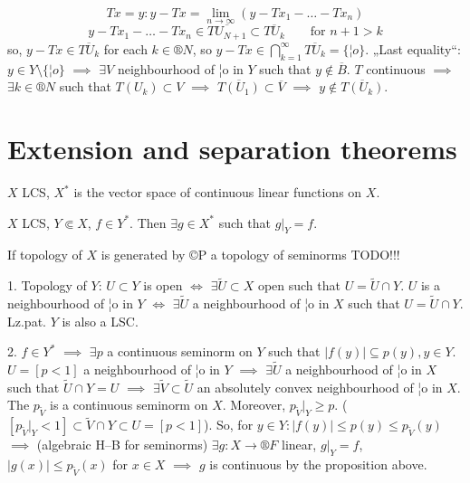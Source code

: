 \documentclass[12pt]{article}					%
\begin{document}
\begin{veta}
\begin{dukazin}
		$$ Tx = y: y - Tx = \lim_{n \rightarrow ∞} (y - Tx_1 - … - Tx_n) $$
		$$ y - Tx_1 - … - Tx_n \in \overline{TU_{N+1}} \subset \overline{TU_k} \qquad \text{for $n+1 > k$} $$
		so, $y - Tx \in \overline{TU_k}$ for each $k \in ®N$, so $y - Tx \in \bigcap_{k=1}^∞ \overline{TU_k} = \{¦o\}$. „Last equality“: $y \in Y \setminus \{¦o\}$ $\implies$ $\exists V$ neighbourhood of ¦o in $Y$ such that $y \notin \overline{B}$. $T$ continuous $\implies$ $\exists k \in ®N$ such that $T(U_k) \subset V$ $\implies$ $\overline{T(U_1)} \subset \overline{V}$ $\implies$ $y \notin \overline{T(U_k)}$.
	\end{dukazin}
\end{veta}

\section{Extension and separation theorems}
\begin{definice}
	$X$ LCS, $X^*$ is the vector space of continuous linear functions on $X$.
\end{definice}

\begin{veta}
	$X$ LCS, $Y \Subset X$, $f \in Y^*$. Then $\exists g \in X^*$ such that $g|_Y = f$.

	\begin{poznamkain}
		If topology of $X$ is generated by ©P a topology of seminorms TODO!!!
	\end{poznamkain}

	\begin{dukazin}
		1. Topology of $Y$: $U \subset Y$ is open $\Leftrightarrow$ $\exists \tilde U \subset X$ open such that $U = \tilde U \cap Y$. $U$ is a neighbourhood of ¦o in $Y$ $\Leftrightarrow$ $\exists \tilde U$ a neighbourhood of ¦o in $X$ such that $U = \tilde U \cap Y$. Lz.pat. $Y$ is also a LSC.

		2. $f \in Y^*$ $\implies$ $\exists p$ a continuous seminorm on $Y$ such that $|f(y)| \subseteq p(y), y \in Y$. $U = [p < 1]$ a neighbourhood of ¦o in $Y$ $\implies$ $\exists \tilde U$ a neighbourhood of ¦o in $X$ such that $\tilde U \cap Y = U$ $\implies$ $\exists \tilde V \subset \tilde U$ an absolutely convex neighbourhood of ¦o in $X$. The $p_{\tilde V}$ is a continuous seminorm on $X$. Moreover, $p_{\tilde V}|_Y ≥ p$. ($[p_{\tilde V}|_Y < 1] \subset \tilde V \cap Y \subset U = [p < 1]$). So, for $y \in Y: |f(y)| ≤ p(y) ≤ p_{\tilde V}(y)$ $\implies$ (algebraic H–B for seminorms) $\exists g: X \rightarrow ®F$ linear, $g|_Y = f$, $|g(x)| ≤ p_{\tilde V}(x)$ for $x \in X$ $\implies$ $g$ is continuous by the proposition above.
	\end{dukazin}
\end{veta}
\end{document}
